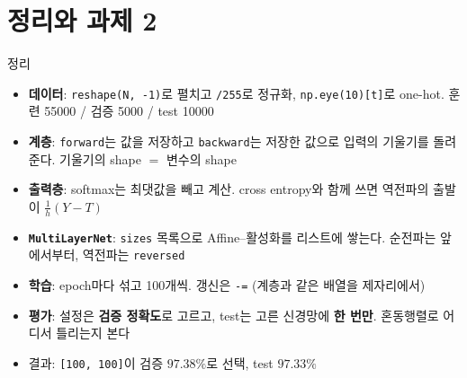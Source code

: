 \documentclass[aspectratio=169,11pt]{beamer}
\newcommand{\code}[1]{\texttt{#1}}
\begin{document}
\section{정리와 과제 2}

\begin{frame}{정리}
\begin{keybox}[이번 시간의 핵심]
\footnotesize
\begin{itemize}\setlength{\itemsep}{0.6mm}
\item \textbf{데이터}: \code{reshape(N, -1)}로 펼치고 \code{/255}로 정규화, \code{np.eye(10)[t]}로 one-hot. 훈련 55000 / 검증 5000 / test 10000
\item \textbf{계층}: \code{forward}는 값을 저장하고 \code{backward}는 저장한 값으로 입력의 기울기를 돌려준다. 기울기의 shape $=$ 변수의 shape
\item \textbf{출력층}: softmax는 최댓값을 빼고 계산. cross entropy와 함께 쓰면 역전파의 출발이 $\frac1h(Y-T)$
\item \textbf{\code{MultiLayerNet}}: \code{sizes} 목록으로 Affine--활성화를 리스트에 쌓는다. 순전파는 앞에서부터, 역전파는 \code{reversed}
\item \textbf{학습}: epoch마다 섞고 100개씩. 갱신은 \code{-=} (계층과 같은 배열을 제자리에서)
\item \textbf{평가}: 설정은 \textbf{검증 정확도}로 고르고, test는 고른 신경망에 \textbf{한 번만}. 혼동행렬로 어디서 틀리는지 본다
\item 결과: \code{[100, 100]}이 검증 $97.38\%$로 선택, test $97.33\%$
\end{itemize}
\end{keybox}
\end{frame}
\end{document}
